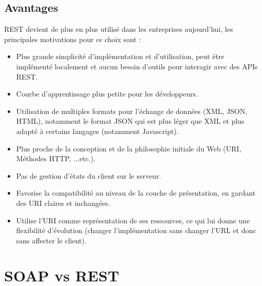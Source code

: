 \subsection{Avantages}
REST devient de plus en plus utilisé dans les entreprises aujourd'hui, les principales motivations pour ce choix sont \cite{refSOAPvsREST} :
\begin{itemize}
	\item Plus grande simplicité d'implémentation et d'utilisation, peut être implémenté localement et aucun besoin d'outils pour interagir avec des APIs REST.
	\item Courbe d'apprentissage plus petite pour les développeurs.
	\item Utilisation de multiples formats pour l'échange de données (XML, JSON, HTML), notamment le format JSON qui est plus léger que XML et plus adapté à certains langages (notamment Javascript).
	\item Plus proche de la conception et de la philosophie initiale du Web (URI, Méthodes HTTP, ...etc.).
	\item Pas de gestion d'états du client sur le serveur.
	\item Favorise la compatibilité au niveau de la couche de présentation, en gardant des URI claires et inchangées.
	\item Utilise l'URI comme représentation de ses ressources, ce qui lui donne une flexibilité d'évolution (changer l'implémentation sans changer l'URL et donc sans affecter le client).
\end{itemize}

\section{SOAP vs REST}

